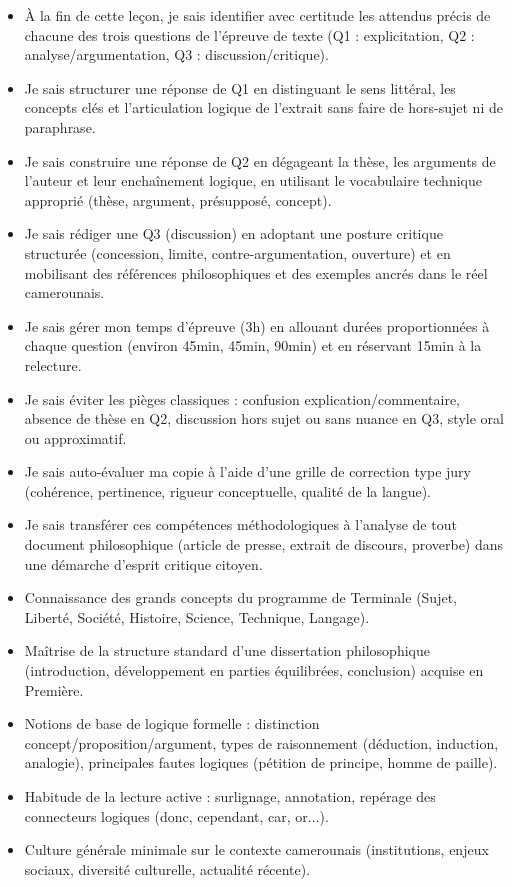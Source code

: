 \documentclass[11pt]{article}
\begin{document}
\begin{objectifs}
\begin{itemize}
\item À la fin de cette leçon, je sais identifier avec certitude les attendus précis de chacune des trois questions de l'épreuve de texte (Q1 : explicitation, Q2 : analyse/argumentation, Q3 : discussion/critique).
\item Je sais structurer une réponse de Q1 en distinguant le sens littéral, les concepts clés et l'articulation logique de l'extrait sans faire de hors-sujet ni de paraphrase.
\item Je sais construire une réponse de Q2 en dégageant la thèse, les arguments de l'auteur et leur enchaînement logique, en utilisant le vocabulaire technique approprié (thèse, argument, présupposé, concept).
\item Je sais rédiger une Q3 (discussion) en adoptant une posture critique structurée (concession, limite, contre-argumentation, ouverture) et en mobilisant des références philosophiques et des exemples ancrés dans le réel camerounais.
\item Je sais gérer mon temps d'épreuve (3h) en allouant durées proportionnées à chaque question (environ 45min, 45min, 90min) et en réservant 15min à la relecture.
\item Je sais éviter les pièges classiques : confusion explication/commentaire, absence de thèse en Q2, discussion hors sujet ou sans nuance en Q3, style oral ou approximatif.
\item Je sais auto-évaluer ma copie à l'aide d'une grille de correction type jury (cohérence, pertinence, rigueur conceptuelle, qualité de la langue).
\item Je sais transférer ces compétences méthodologiques à l'analyse de tout document philosophique (article de presse, extrait de discours, proverbe) dans une démarche d'esprit critique citoyen.
\end{itemize}
\end{objectifs}

\begin{prerequis}
\begin{itemize}
\item Connaissance des grands concepts du programme de Terminale (Sujet, Liberté, Société, Histoire, Science, Technique, Langage).
\item Maîtrise de la structure standard d'une dissertation philosophique (introduction, développement en parties équilibrées, conclusion) acquise en Première.
\item Notions de base de logique formelle : distinction concept/proposition/argument, types de raisonnement (déduction, induction, analogie), principales fautes logiques (pétition de principe, homme de paille).
\item Habitude de la lecture active : surlignage, annotation, repérage des connecteurs logiques (donc, cependant, car, or...).
\item Culture générale minimale sur le contexte camerounais (institutions, enjeux sociaux, diversité culturelle, actualité récente).
\end{itemize}
\end{prerequis}
\end{document}
